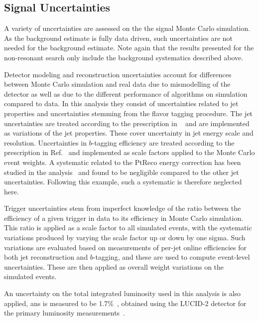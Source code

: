 \FloatBarrier
\subsection{Signal Uncertainties}%
\label{subsec:modelling-uncerts}
A variety of uncertainties are assessed on the the signal Monte Carlo simulation.  
As the background estimate is fully data driven, such uncertainties are not needed for 
the background estimate. Note again that the results presented for the non-resonant search only 
include the background systematics described above.

Detector modeling and reconstruction uncertainties account for differences 
between Monte Carlo simulation and real data due to mismodelling of the detector
as well as due to the different performance of algorithms on simulation compared to data. 
In this analysis they consist of uncertainties related to jet properties and uncertainties stemming 
from the flavor tagging procedure. The jet uncertainties are treated according to the prescription in 
~\cite{JETM-2018-05} and are implemented as variations of the jet properties. These cover 
uncertainty in jet energy scale and resolution. Uncertainties in $b$-tagging efficiency are 
treated according to the prescription in Ref.~\cite{FTAG-2018-01} and implemented 
as scale factors applied to the Monte Carlo event weights. A systematic related to the PtReco \bjet 
energy correction has been studied in the \HepProcess{\higgs\higgs \to \gamma\gamma\Pqb\Paqb} 
analysis~\cite{bbyyNote} and found to be negligible compared to the other jet uncertainties. Following this 
example, such a systematic is therefore neglected here.

Trigger uncertainties stem from imperfect knowledge of the ratio between the
efficiency of a given trigger in data to its efficiency in Monte Carlo
simulation. This ratio is applied as a scale factor to all simulated events, with the 
systematic variations produced by varying the scale factor up or down by one sigma.
Such variations are evaluated based on measurements of per-jet online efficiencies for both jet reconstruction 
and $b$-tagging, and these are used to compute event-level uncertainties.
These are then applied as overall weight variations on the simulated events.

An uncertainty on the total integrated luminosity used in this analysis is also applied, 
ans is measured to be 1.7\%~\cite{ATLAS-CONF-2019-021}, obtained using the LUCID-2 detector for 
the primary luminosity measurements~\cite{Avoni:2633501}.

